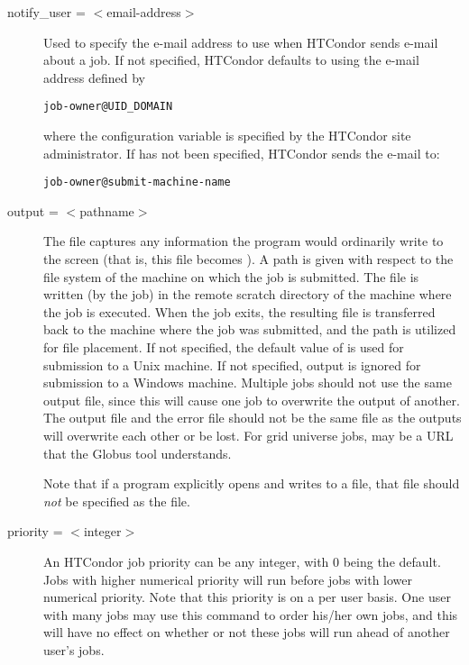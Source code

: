 \begin{description}

\label{man-condor-submit-notify-user}
\item[notify\_user = $<$email-address$>$]
Used to specify the e-mail
address to use when HTCondor sends e-mail about a job.  If not specified,
HTCondor defaults to using the e-mail address defined by
\begin{verbatim}
job-owner@UID_DOMAIN
\end{verbatim}
where the configuration variable 
is specified by the HTCondor site administrator.
If  has not been specified,
HTCondor sends the e-mail to:
\begin{verbatim}
job-owner@submit-machine-name
\end{verbatim}


\label{man-condor-submit-output}
\item[output = $<$pathname$>$]
The  file captures
any information the program would ordinarily write to the screen
(that is, this file becomes ).
A path is given with respect to the file system of the machine
on which the job is submitted.
The file is written (by the job)
in the remote scratch directory of the machine where the job is executed. 
When the job exits, the resulting file is transferred back to the machine
where the job was submitted, and the path is utilized for file placement.
If not specified, the default value of
 is used for submission to a Unix machine.
If not specified, output is ignored
for submission to a Windows machine.
Multiple jobs should not use the same output
file, since this will cause one job to overwrite the output of
another.
The output file and the error file should not be the same file
as the outputs will overwrite each other or be lost.
For grid universe jobs,  may be a URL that the Globus
tool  understands.

Note that if a program explicitly opens and writes to a file,
that file should \emph{not} be specified as the  file.


\label{man-condor-submit-priority}
\item[priority = $<$integer$>$] 
An HTCondor job priority 
can be any integer, with 0 being the default.
Jobs with higher numerical priority will
run before jobs with lower numerical priority. Note that this priority
is on a per user basis.
One user with many jobs may use this command
to order his/her own jobs,
and this will have no effect on whether or
not these jobs will run ahead of another user's jobs.


\end{description}
